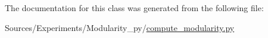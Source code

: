 The documentation for this class was generated from the following file\+:\begin{DoxyCompactItemize}
\item 
Sources/\+Experiments/\+Modularity\+\_\+py/\hyperlink{compute__modularity_8py}{compute\+\_\+modularity.\+py}\end{DoxyCompactItemize}
